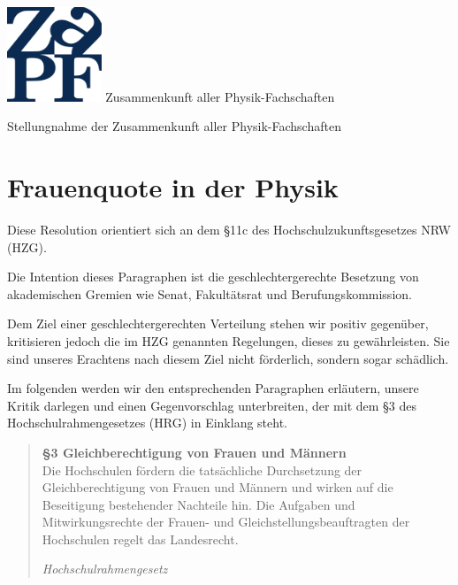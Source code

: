 \documentclass[DIV=calc]{scrartcl}
\begin{document}
\hspace{0.87\textwidth}
\begin{minipage}{120pt}
\vspace{-1.8cm}
\includegraphics[width=80pt]{../../logo.pdf}
\centering
\small Zusammenkunft aller Physik-Fachschaften
\end{minipage}
\begin{center}
\huge{Stellungnahme der Zusammenkunft aller Physik-Fachschaften} \\
\normalsize
\end{center}

\vspace{1cm}
\section*{Frauenquote in der Physik}

Diese Resolution orientiert sich an dem §11c des Hochschulzukunftsgesetzes NRW (HZG).

Die Intention dieses Paragraphen ist die geschlechtergerechte Besetzung von akademischen
Gremien wie Senat, Fakultätsrat und Berufungskommission.

Dem Ziel einer geschlechtergerechten Verteilung stehen wir positiv gegenüber, kritisieren
jedoch die im HZG genannten Regelungen, dieses zu gewährleisten. Sie sind unseres
Erachtens nach diesem Ziel nicht förderlich, sondern sogar schädlich.

Im folgenden werden wir den entsprechenden Paragraphen erläutern, unsere Kritik
darlegen und einen Gegenvorschlag unterbreiten, der mit dem §3 des Hochschulrahmengesetzes (HRG)
in Einklang steht.

\begin{quotation}
	\textbf{§3 Gleichberechtigung von Frauen und Männern}\\
	Die Hochschulen fördern die tatsächliche Durchsetzung der Gleichberechtigung von Frauen und Männern
	und wirken auf die Beseitigung bestehender Nachteile hin. Die Aufgaben und Mitwirkungsrechte der
	Frauen- und Gleichstellungsbeauftragten der Hochschulen regelt das Landesrecht.

	\hfill \textit{Hochschulrahmengesetz}
\end{quotation}
\end{document}
